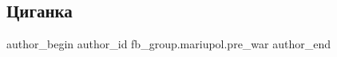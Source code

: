  
 
 
 
 

\subsection{Циганка}
\label{sec:13_01_2023.fb.fb_group.mariupol.pre_war.1.tsiganka}

\ifcmt
 author_begin
   author_id fb_group.mariupol.pre_war
 author_end
\fi
